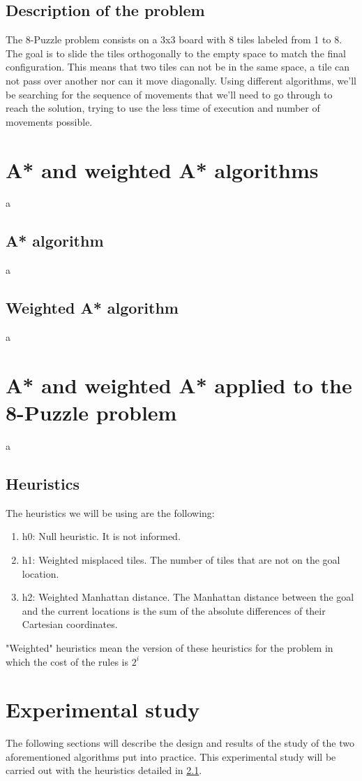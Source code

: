 \documentclass[runningheads]{llncs}
\begin{document}
\subsection{Description of the problem}
The 8-Puzzle problem consists on a 3x3 board with 8 tiles labeled from 1 to 8. The goal is to slide the tiles orthogonally to the empty space to match the final configuration. This means that two tiles can not be in the same space, a tile can not pass over another nor can it move diagonally.
Using different algorithms, we'll be searching for the sequence of movements that we'll need to go through to reach the solution, trying to use the less time of execution and number of movements possible.

\section{A* and weighted A* algorithms} \label{s:awa}
a
\subsection{A* algorithm}
a
\subsection{Weighted A* algorithm}
a
\section{A* and weighted A* applied to the 8-Puzzle problem} \label{s:awa8p}
a
\subsection{Heuristics}\label{ss:heuristics}
The heuristics we will be using are the following:
\begin{enumerate}
\item h0: Null heuristic. It is not informed.
\item h1: Weighted misplaced tiles. The number of tiles that are not on the goal location.
\item h2: Weighted Manhattan distance. The Manhattan distance between the goal and the current locations is the sum of the absolute differences of their Cartesian coordinates.
\end{enumerate}
"Weighted" heuristics mean the version of these heuristics for the problem in which the cost of the rules is \(2^i\)

\section{Experimental study}
The following sections will describe the design and results of the study of the two aforementioned algorithms put into practice. This experimental study will be carried out with the heuristics detailed in \ref{ss:heuristics}.
\end{document}

